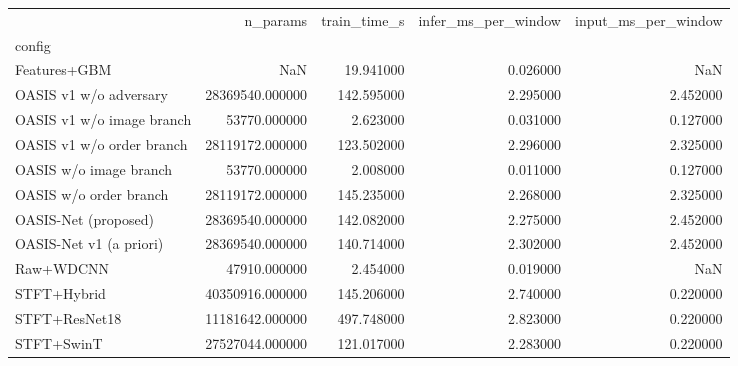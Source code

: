 \begin{tabular}{lrrrr}
\toprule
 & n\_params & train\_time\_s & infer\_ms\_per\_window & input\_ms\_per\_window \\
config &  &  &  &  \\
\midrule
Features+GBM & NaN & 19.941000 & 0.026000 & NaN \\
OASIS v1 w/o adversary & 28369540.000000 & 142.595000 & 2.295000 & 2.452000 \\
OASIS v1 w/o image branch & 53770.000000 & 2.623000 & 0.031000 & 0.127000 \\
OASIS v1 w/o order branch & 28119172.000000 & 123.502000 & 2.296000 & 2.325000 \\
OASIS w/o image branch & 53770.000000 & 2.008000 & 0.011000 & 0.127000 \\
OASIS w/o order branch & 28119172.000000 & 145.235000 & 2.268000 & 2.325000 \\
OASIS-Net (proposed) & 28369540.000000 & 142.082000 & 2.275000 & 2.452000 \\
OASIS-Net v1 (a priori) & 28369540.000000 & 140.714000 & 2.302000 & 2.452000 \\
Raw+WDCNN & 47910.000000 & 2.454000 & 0.019000 & NaN \\
STFT+Hybrid & 40350916.000000 & 145.206000 & 2.740000 & 0.220000 \\
STFT+ResNet18 & 11181642.000000 & 497.748000 & 2.823000 & 0.220000 \\
STFT+SwinT & 27527044.000000 & 121.017000 & 2.283000 & 0.220000 \\
\bottomrule
\end{tabular}
